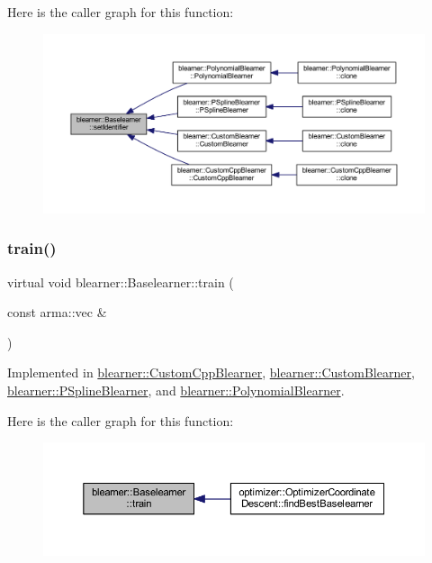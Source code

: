 Here is the caller graph for this function\+:
\nopagebreak
\begin{figure}[H]
\begin{center}
\leavevmode
\includegraphics[width=350pt]{classblearner_1_1_baselearner_a6669906a481cbdd516dce8df6f6e5b76_icgraph}
\end{center}
\end{figure}
\mbox{\label{classblearner_1_1_baselearner_a40e03ad070b9a03aae706d9ee8094b80}} 
\subsubsection{\texorpdfstring{train()}{train()}}
{\footnotesize\ttfamily virtual void blearner\+::\+Baselearner\+::train (\begin{DoxyParamCaption}\item[{const arma\+::vec \&}]{ }\end{DoxyParamCaption})\hspace{0.3cm}{\ttfamily [pure virtual]}}



Implemented in \mbox{\hyperlink{classblearner_1_1_custom_cpp_blearner_aa71b777d7092a3d9b47a9bed125eb0f9}{blearner\+::\+Custom\+Cpp\+Blearner}}, \mbox{\hyperlink{classblearner_1_1_custom_blearner_a4726c5b861b67817f7b3eb61d8f6c0d7}{blearner\+::\+Custom\+Blearner}}, \mbox{\hyperlink{classblearner_1_1_p_spline_blearner_aa5c18ceb8396ffce556588486d574be8}{blearner\+::\+P\+Spline\+Blearner}}, and \mbox{\hyperlink{classblearner_1_1_polynomial_blearner_acf24025a73293a2569450dd4659e0997}{blearner\+::\+Polynomial\+Blearner}}.

Here is the caller graph for this function\+:
\nopagebreak
\begin{figure}[H]
\begin{center}
\leavevmode
\includegraphics[width=350pt]{classblearner_1_1_baselearner_a40e03ad070b9a03aae706d9ee8094b80_icgraph}
\end{center}
\end{figure}


